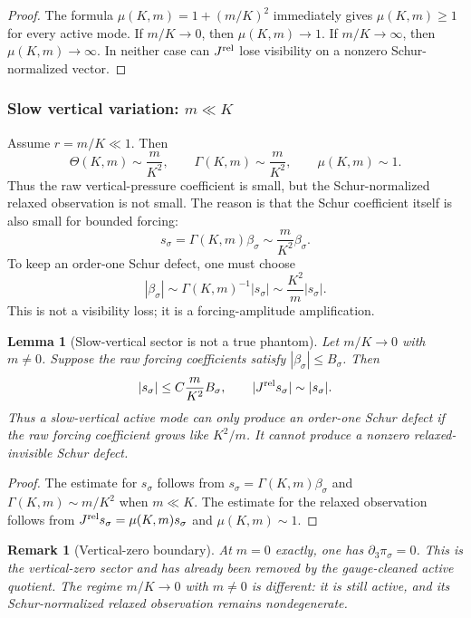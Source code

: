 \documentclass[11pt]{article}
\numberwithin{equation}{section}
\newtheorem{lemma}[theorem]{Lemma}
\newtheorem{remark}[theorem]{Remark}
\begin{document}
\begin{proof}
The formula \(\mu(K,m)=1+(m/K)^2\) immediately gives \(\mu(K,m)\ge1\) for every active mode.  If \(m/K\to0\), then \(\mu(K,m)\to1\).  If \(m/K\to\infty\), then \(\mu(K,m)\to\infty\).  In neither case can \(J^{\rm rel}\) lose visibility on a nonzero Schur-normalized vector.
\end{proof}

\subsubsection*{Slow vertical variation: \(m\ll K\)}

Assume \(r=m/K\ll1\).  Then
\[
        \Theta(K,m)\sim \frac{m}{K^2},
        \qquad
        \Gamma(K,m)\sim \frac{m}{K^2},
        \qquad
        \mu(K,m)\sim1.
\]
Thus the raw vertical-pressure coefficient is small, but the Schur-normalized relaxed observation is not small.  The reason is that the Schur coefficient itself is also small for bounded forcing:
\[
        s_\sigma=\Gamma(K,m)\beta_\sigma
        \sim \frac{m}{K^2}\beta_\sigma.
\]
To keep an order-one Schur defect, one must choose
\[
        |\beta_\sigma|\sim \Gamma(K,m)^{-1}|s_\sigma|
        \sim \frac{K^2}{m}|s_\sigma|.
\]
This is not a visibility loss; it is a forcing-amplitude amplification.

\begin{lemma}[Slow-vertical sector is not a true phantom]\label{lem:slow-vertical-sector-not-phantom}
Let \(m/K\to0\) with \(m\neq0\).  Suppose the raw forcing coefficients satisfy \(|\beta_\sigma|\le B_\sigma\).  Then
\[
        |s_\sigma|\le C\frac{m}{K^2}B_\sigma,
        \qquad
        |J^{\rm rel}s_\sigma|\sim |s_\sigma|.
\]
Thus a slow-vertical active mode can only produce an order-one Schur defect if the raw forcing coefficient grows like \(K^2/m\).  It cannot produce a nonzero relaxed-invisible Schur defect.
\end{lemma}

\begin{proof}
The estimate for \(s_\sigma\) follows from \(s_\sigma=\Gamma(K,m)\beta_\sigma\) and \(\Gamma(K,m)\sim m/K^2\) when \(m\ll K\).  The estimate for the relaxed observation follows from \(J^{\rm rel}s_\sigma=\mu(K,m)s_\sigma\) and \(\mu(K,m)\sim1\).
\end{proof}

\begin{remark}[Vertical-zero boundary]
At \(m=0\) exactly, one has \(\partial_3\pi_\sigma=0\).  This is the vertical-zero sector and has already been removed by the gauge-cleaned active quotient.  The regime \(m/K\to0\) with \(m\neq0\) is different: it is still active, and its Schur-normalized relaxed observation remains nondegenerate.
\end{remark}
\end{document}
